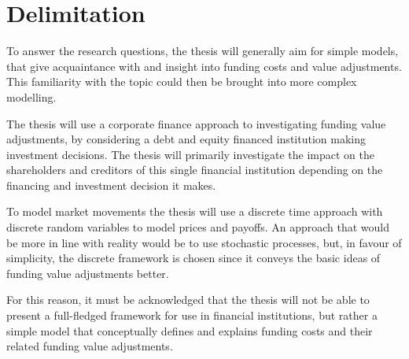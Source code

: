 \documentclass[main.tex]{subfiles}
\begin{document}
    \section{Delimitation}

    To answer the research questions, the thesis will generally aim for simple models,
    that give acquaintance with and insight into funding costs and value adjustments.
    This familiarity with the topic could then be brought into more complex modelling.

    The thesis will use a corporate finance approach to investigating funding value adjustments,
    by considering a debt and equity financed institution making investment decisions.
    The thesis will primarily investigate the impact on the shareholders and creditors 
    of this single financial institution depending on the financing and investment decision it makes.

    To model market movements the thesis will use a discrete time approach 
    with discrete random variables to model prices and payoffs.
    An approach that would be more in line with reality would be to use stochastic processes,
    but, in favour of simplicity, the discrete framework is chosen 
    since it conveys the basic ideas of funding value adjustments better.

    For this reason, it must be acknowledged that the thesis will not be able to
    present a full-fledged framework for use in financial institutions,
    but rather a simple model that conceptually defines and explains funding costs 
    and their related funding value adjustments.
\end{document}
